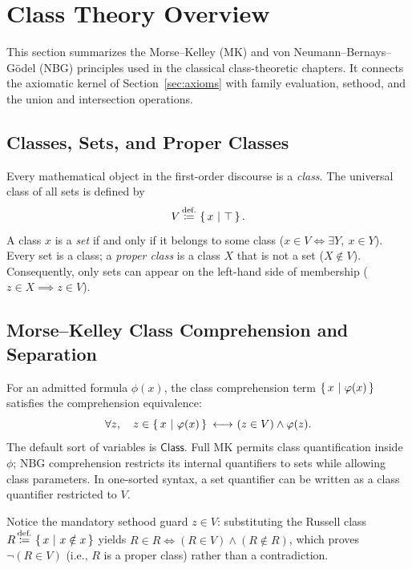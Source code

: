 \def\topic{Class Theory Overview}

\section{Class Theory Overview}
\label{sec:class_theory_overview}

This section summarizes the Morse--Kelley (MK) and
von Neumann--Bernays--G\"odel (NBG) principles used in the classical
class-theoretic chapters. It connects the axiomatic kernel of
Section~\ref{sec:axioms} with family evaluation, sethood, and the
union and intersection operations.

\subsection{Classes, Sets, and Proper Classes}
\label{subsec:classes_sets_proper}

Every mathematical object in the first-order discourse is a \emph{class}. The universal class of all sets is defined by
\[
V \,{\stackrel{{\textrm{def.}}}{\coloneqq}}\, \left\{\,x\ \middle|\ \top\,\right\}.
\]
A class $x$ is a \emph{set} if and only if it belongs to some class ($x \in V \iff \exists Y,\ x \in Y$). Every set is a class; a \emph{proper class} is a class $X$ that is not a set ($X \notin V$). Consequently, only sets can appear on the left-hand side of membership ($z \in X \implies z \in V$).

\subsection{Morse--Kelley Class Comprehension and Separation}
\label{subsec:mk_comprehension_separation}

For an admitted formula $\phi(x)$, the class comprehension term $\left\{\,x\ \middle|\ \varphi(x)\,\right\}$ satisfies the comprehension equivalence:
\[
\forall z,\quad z \in \left\{\,x\ \middle|\ \varphi(x)\,\right\} {\ \longleftrightarrow\ } (z \in V) \land \varphi(z).
\]
The default sort of variables is $\mathsf{Class}$. Full MK permits class
quantification inside $\phi$; NBG comprehension restricts its internal
quantifiers to sets while allowing class parameters. In one-sorted syntax,
a set quantifier can be written as a class quantifier restricted to $V$.

Notice the mandatory sethood guard $z \in V$: substituting the Russell class $R \,{\stackrel{{\textrm{def.}}}{\coloneqq}}\, \left\{\,x\ \middle|\ x \notin x\,\right\}$ yields $R \in R \iff (R \in V) \land (R \notin R)$, which proves $\lnot(R \in V)$ (i.e., $R$ is a proper class) rather than a contradiction.

